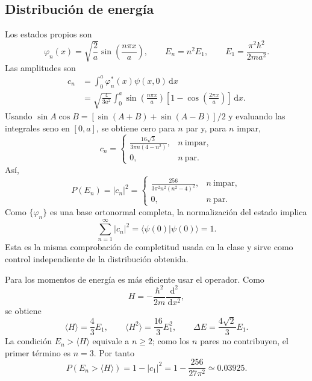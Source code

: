 \documentclass[11pt,a4paper]{article}
\numberwithin{equation}{section}
\renewcommand{\boxed}[1]{#1}
\newcommand{\dd}{\,\mathrm d}
\newcommand{\hb}{\hbar}
\begin{document}
\subsection{Distribución de energía}
Los estados propios son
\begin{equation}
\varphi_n(x)=\sqrt{\frac2a}\sin\left(\frac{n\pi x}{a}\right),\qquad
E_n=n^2E_1,\qquad E_1=\frac{\pi^2\hb^2}{2ma^2}.
\end{equation}
Las amplitudes son
\begin{align}
c_n&=\int_0^a\varphi_n^*(x)\psi(x,0)\,\mathrm dx\\
&=\sqrt{\frac{4}{3a^2}}\int_0^a\sin\left(\frac{n\pi x}{a}\right)
\left[1-\cos\left(\frac{2\pi x}{a}\right)\right]\,\mathrm dx.
\end{align}
Usando $\sin A\cos B=[\sin(A+B)+\sin(A-B)]/2$ y evaluando las integrales seno en $[0,a]$, se obtiene cero para $n$ par y, para $n$ impar,
\begin{equation}
c_n=\begin{cases}
\displaystyle \frac{16\sqrt3}{3\pi n(4-n^2)},& n\ \text{impar},\\[6pt]
0,& n\ \text{par}.
\end{cases}
\end{equation}
Así,
\begin{equation}
\boxed{P(E_n)=|c_n|^2=\begin{cases}
\displaystyle\frac{256}{3\pi^2n^2(n^2-4)^2},&n\ \text{impar},\\[5pt]0,&n\ \text{par}.
\end{cases}}
\end{equation}
Como $\{\varphi_n\}$ es una base ortonormal completa, la normalización del estado implica
\begin{equation}
\sum_{n=1}^{\infty}|c_n|^2=\langle\psi(0)|\psi(0)\rangle=1.
\end{equation}
Esta es la misma comprobación de completitud usada en la clase y sirve como control independiente de la distribución obtenida.

Para los momentos de energía es más eficiente usar el operador. Como
\begin{equation}
H=-\frac{\hb^2}{2m}\frac{\dd^2}{\dd x^2},
\end{equation}
se obtiene
\begin{equation}
\boxed{\langle H\rangle=\frac43E_1,\qquad
\langle H^2\rangle=\frac{16}{3}E_1^2,
\qquad \Delta E=\frac{4\sqrt2}{3}E_1.}
\end{equation}
La condición $E_n>\langle H\rangle$ equivale a $n\ge2$; como los $n$ pares no contribuyen, el primer término es $n=3$. Por tanto
\begin{equation}
\boxed{P(E_n>\langle H\rangle)=1-|c_1|^2=1-\frac{256}{27\pi^2}\simeq0.03925.}
\end{equation}
\end{document}
